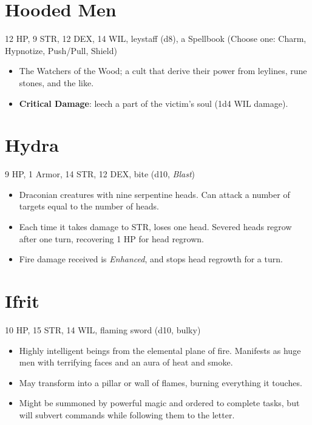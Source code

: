 \documentclass[
  10pt,
  american,
]{article}
\begin{document}
\hypertarget{hooded-men}{%
\section{Hooded Men}\label{hooded-men}}

12 HP, 9 STR, 12 DEX, 14 WIL, leystaff (d8), a Spellbook (Choose one:
Charm, Hypnotize, Push/Pull, Shield)

\begin{samepage}
\begin{itemize}
\setlength\itemsep{-.5em}
\item The Watchers of the Wood; a cult that derive their power from leylines, rune stones, and the like.
\item \textbf{Critical Damage}: leech a part of the victim's soul (1d4 WIL damage).
\end{itemize}
\end{samepage}

\hypertarget{hydra}{%
\section{Hydra}\label{hydra}}

9 HP, 1 Armor, 14 STR, 12 DEX, bite (d10, \emph{Blast})

\begin{samepage}
\begin{itemize}
\setlength\itemsep{-.5em}
\item Draconian creatures with nine serpentine heads. Can attack a number of targets equal to the number of heads.
\item Each time it takes damage to STR, loses one head. Severed heads regrow after one turn, recovering 1 HP for head regrown.
\item Fire damage received is \emph{Enhanced}, and stops head regrowth for a turn.
\end{itemize}
\end{samepage}

\hypertarget{ifrit}{%
\section{Ifrit}\label{ifrit}}

10 HP, 15 STR, 14 WIL, flaming sword (d10, bulky)

\begin{samepage}
\begin{itemize}
\setlength\itemsep{-.5em}
\item Highly intelligent beings from the elemental plane of fire.  Manifests as huge men with terrifying faces and an aura of heat and smoke.
\item May transform into a pillar or wall of flames, burning everything it touches.
\item Might be summoned by powerful magic and ordered to complete tasks, but will subvert commands while following them to the letter.
\end{itemize}
\end{samepage}
\end{document}
